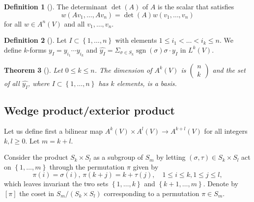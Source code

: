 \documentclass[reqno]{amsart}
\newtheorem{theorem}{Theorem}[section]
\theoremstyle{definition}
\newtheorem{definition}[theorem]{Definition}
\theoremstyle{remark}
\DeclareMathOperator{\sgn}{sgn}
\begin{document}
     \begin{definition}[]
         The determinant $\det (A)$ of $A$ is
         the scalar that satisfies
         \[
         w \left( A v_1, \ldots, Av_n \right) 
         = \det \left( A \right) 
         w \left( v_1, \ldots, v_n \right) 
         \] 
         for all $w \in A^{n}(V)$ and all $v_1,\ldots, v_n$.
     \end{definition}

     \begin{definition}[]
         Let $I \subset \left\{ 1,\ldots, n \right\} $ with
         elements $1 \le i_1 < \ldots < i_k \le n$.
         We define $k$-forms $y_I = 
         y_{i_1} \cdots y_{i_k}$ and
         $\widehat{y_I} = 
         \Sigma_{\sigma \in S_k} \sgn (\sigma)
         \sigma \cdot y_I$ in $L^{k}(V)$.
     \end{definition}

     \begin{theorem}[]
         Let $0 \le k \le n$. The dimension
         of $A^{k}(V)$ is 
         $\begin{pmatrix} n\\k \end{pmatrix} $ and the
         set of all $\widehat{y_I}$, where
         $I \subset \left\{ 1, \ldots, n \right\} $ has
         $k$ elements, is a basis.
     \end{theorem}

     \subsection{Wedge product/exterior product}

     Let us define first a bilinear map
      $A^{k}(V) \times A^{l}(V) \to A^{k+l}(V)$
      for all integers $k,l\ge 0$.
      Let $m = k+l$.

      Consider the product $S_k \times S_l$ as a
      subgroup of $S_m$ by letting
      $\left( \sigma, \tau \right) \in 
      S_k \times S_l$ act
      on $\left\{ 1, \ldots, m \right\} $ through the
      permutation $\pi$ given by
      \[
      \pi(i) = \sigma(i), \,
      \pi(k+j) = k + \tau(j), \quad
      1 \le i \le k, 1 \le j \le l,
      \] 
      which leaves invariant the two sets
      $\left\{ 1,\ldots, k \right\} $ and
      $\left\{ k+1,\ldots,m \right\} $.
      Denote by $\left[ \pi \right] $ the coset
      in $S_m / \left( S_k \times S_l \right) $ corresponding
      to a permutation $\pi \in S_m$.
\end{document}
